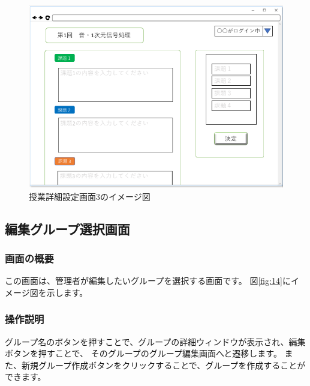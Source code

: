 \begin{figure}[htbp]
  \begin{center}
    \includegraphics[width=1\linewidth,clip]{./img/13.png}
    \caption{授業詳細設定画面3のイメージ図}\label{fig:13}
  \end{center}
\end{figure}

\newpage

\subsection{編集グループ選択画面}
\subsubsection{画面の概要}
この画面は、管理者が編集したいグループを選択する画面です。
図\ref{fig:14}にイメージ図を示します。

\subsubsection{操作説明}
グループ名のボタンを押すことで、グループの詳細ウィンドウが表示され、編集ボタンを押すことで、
そのグループのグループ編集画面へと遷移します。
また、新規グループ作成ボタンをクリックすることで、グループを作成することができます。

